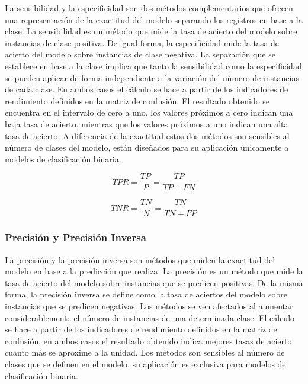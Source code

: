 La sensibilidad y la especificidad \cite{Florkowski2008}\cite{tharwat_2018} son dos métodos complementarios que ofrecen una representación de la exactitud del modelo separando los registros en base a la clase. La sensibilidad es un método que mide la tasa de acierto del modelo sobre instancias de clase positiva. De igual forma, la especificidad mide la tasa de acierto del modelo sobre instancias de clase negativa. La separación que se establece en base a la clase implica que tanto la sensibilidad como la especificidad se pueden aplicar de forma independiente a la variación del número de instancias de cada clase. En ambos casos el cálculo se hace a partir de los indicadores de rendimiento definidos en la matriz de confusión. El resultado obtenido se encuentra en el intervalo de cero a uno, los valores próximos a cero indican una baja tasa de acierto, mientras que los valores próximos a uno indican una alta tasa de acierto. A diferencia de la exactitud estos dos métodos son sensibles al número de clases del modelo, están diseñados para su aplicación únicamente a modelos de clasificación binaria.

\bigbreak

\begin{equation}
    TPR = \frac{TP}{P} = \frac{TP}{TP+FN}
    \label{eq:TPR}      
\end{equation}

\bigbreak

\begin{equation}
    TNR = \frac{TN}{N} = \frac{TN}{TN+FP}
    \label{eq:TNR}    
\end{equation}


\subsubsection{Precisión y Precisión Inversa}

La precisión y la precisión inversa \cite{tharwat_2018} son métodos que miden la exactitud del modelo en base a la predicción que realiza. La precisión es un método que mide la tasa de acierto del modelo sobre instancias que se predicen positivas. De la misma forma, la precisión inversa se define como la tasa de aciertos del modelo sobre instancias que se predicen negativas. Los métodos se ven afectados al aumentar considerablemente el número de instancias de una determinada clase. El cálculo se hace a partir de los indicadores de rendimiento definidos en la matriz de confusión, en ambos casos el resultado obtenido indica mejores tasas de acierto cuanto más se aproxime a la unidad. Los métodos son sensibles al número de clases que se definen en el modelo, su aplicación es exclusiva para modelos de clasificación binaria.

